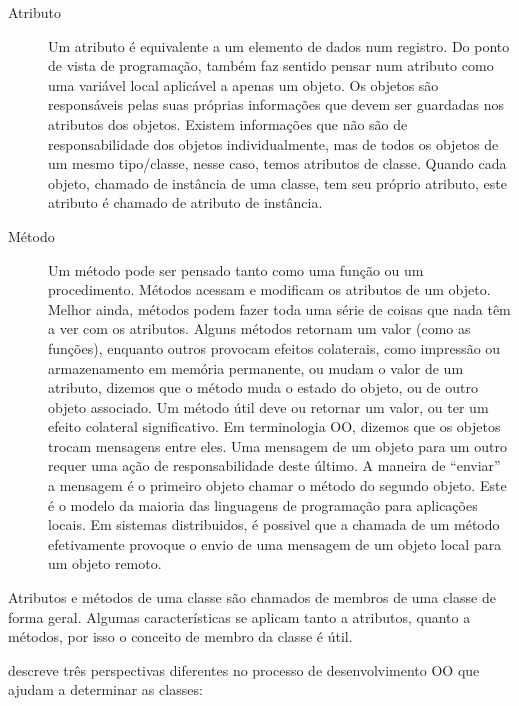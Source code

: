 \begin{description}
\item[Atributo] Um atributo é equivalente a um elemento de dados num registro. Do ponto de vista de programação, também faz sentido pensar num atributo como uma variável local aplicável a apenas um objeto. Os objetos são responsáveis pelas suas próprias informações que devem ser guardadas nos atributos dos objetos. Existem informações que não são de responsabilidade dos objetos individualmente, mas de todos os objetos de um mesmo tipo/classe, nesse caso, temos atributos de classe. Quando cada objeto, chamado de instância de uma classe, tem seu próprio atributo, este atributo é chamado de atributo de instância.

\item[Método] Um método pode ser pensado tanto como uma função ou um procedimento. Métodos acessam e modificam os atributos de um objeto. Melhor ainda, métodos podem fazer toda uma série de coisas que nada têm a ver com os atributos. Alguns métodos retornam um valor (como as funções), enquanto outros provocam efeitos colaterais, como impressão ou armazenamento em memória permanente, ou mudam o valor de um atributo, dizemos que o método muda o estado do objeto, ou de outro objeto associado. Um método útil deve ou retornar um valor, ou ter um efeito colateral significativo. Em terminologia OO, dizemos que os objetos trocam mensagens entre eles. Uma mensagem de um objeto para um outro requer uma ação de responsabilidade deste último. A maneira de ``enviar'' a mensagem é o primeiro objeto chamar o método do segundo objeto. Este é o modelo da maioria das linguagens de programação para aplicações locais. Em sistemas distribuidos, é possivel que a chamada de um método efetivamente provoque o envio de uma mensagem de um objeto local para um objeto remoto.

\end{description}

Atributos e métodos de uma classe são chamados de membros de uma classe de forma geral. Algumas características se aplicam tanto a atributos, quanto a métodos, por isso o conceito de membro da classe é útil.

\cite{uml:destilado} descreve três perspectivas diferentes no processo de desenvolvimento OO que ajudam a determinar as classes:

